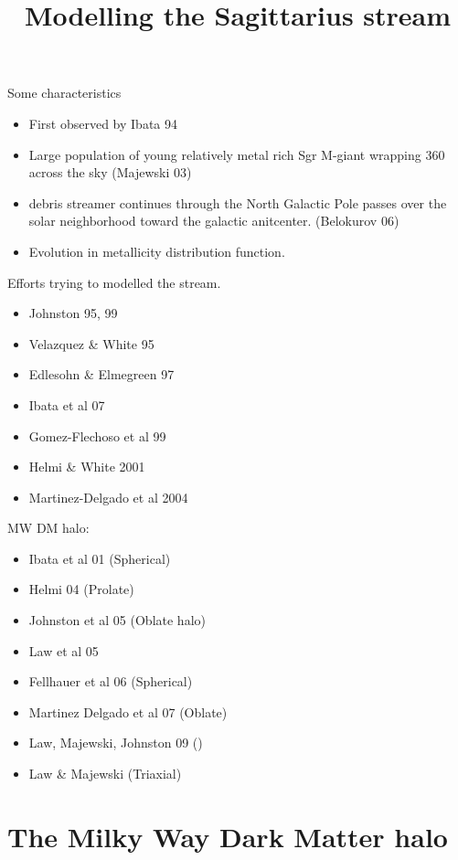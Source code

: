 \documentclass[12pt]{article}
\title{\begin{LARGE}
{Modelling the Sagittarius stream}
\end{LARGE}}
\begin{document}
\maketitle

Some characteristics

\begin{itemize}
\item First observed by Ibata 94
\item Large population of young relatively metal rich Sgr M-giant wrapping 360
across the sky  (Majewski 03)
\item debris streamer continues through the North Galactic Pole passes over the 
solar neighborhood toward the galactic anitcenter. (Belokurov 06)
\item Evolution in metallicity distribution function.
\end{itemize}

Efforts trying to modelled the stream.

\begin{itemize}
\item Johnston 95, 99
\item Velazquez \& White 95
\item Edlesohn \& Elmegreen 97
\item Ibata et al 07
\item Gomez-Flechoso et al 99
\item Helmi \& White 2001
\item Martinez-Delgado et al 2004
\end{itemize}

MW DM halo:

\begin{itemize}
\item Ibata et al 01 (Spherical)
\item Helmi 04 (Prolate)
\item Johnston et al 05 (Oblate halo)
\item Law et al 05
\item Fellhauer et al 06 (Spherical)
\item Martinez Delgado et al 07 (Oblate)
\item Law, Majewski, Johnston 09 ()
\item Law \& Majewski (Triaxial)
\end{itemize}

\section{The Milky Way Dark Matter halo}
\end{document}
